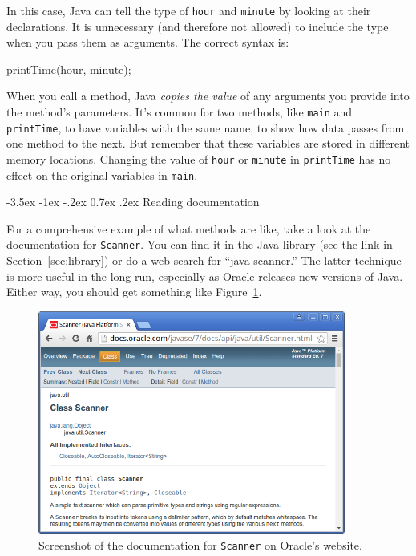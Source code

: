 \documentclass[12pt]{book}
\makeatletter
\theoremstyle{exercise}
\newcommand{\java}[1]{\verb"#1"}
\renewcommand{\section}{\@startsection{section}{1}{\z@}%
    {-3.5ex \@plus -1ex \@minus -.2ex}%
    {0.7ex \@plus.2ex}%
    {\normalfont\Large\bfseries}}
\newcommand{\java}[1]{\lstinline{#1}} %
\makeatother
\begin{document}
In this case, Java can tell the type of \java{hour} and \java{minute} by looking at their declarations.
It is unnecessary (and therefore not allowed) to include the type when you pass them as arguments.
The correct syntax is:

\begin{code}
    printTime(hour, minute);
\end{code}

When you call a method, Java {\it copies the value} of any arguments you provide into the method's parameters.
It's common for two methods, like \java{main} and \java{printTime}, to have variables with the same name, to show how data passes from one method to the next.
But remember that these variables are stored in different memory locations.
Changing the value of \java{hour} or \java{minute} in \java{printTime} has no effect on the original variables in \java{main}.


\section{Reading documentation}
\label{sec:apidocs}


For a comprehensive example of what methods are like, take a look at the documentation for \java{Scanner}.
You can find it in the Java library (see the link in Section~\ref{sec:library}) or do a web search for ``java scanner.''
The latter technique is more useful in the long run, especially as Oracle releases new versions of Java.
Either way, you should get something like Figure~\ref{fig:javadoc}.

\begin{figure}[!h]
\begin{center}
\includegraphics[width=0.9\textwidth]{figs/scanner.png}
\caption{Screenshot of the documentation for \java{Scanner} on Oracle's website.}
\label{fig:javadoc}
\end{center}
\end{figure}
\end{document}
